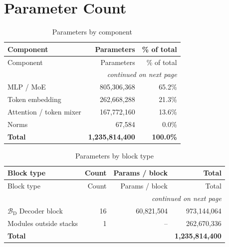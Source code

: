\documentclass[10pt,a4paper]{article}
\begin{document}
\section{Parameter Count}
\begin{longtable}{lrr}
\caption{Parameters by component}\\
\toprule
Component & Parameters & \% of total \\
\midrule
\endfirsthead
\toprule
Component & Parameters & \% of total \\
\midrule
\endhead
\midrule \multicolumn{3}{r}{\textit{continued on next page}} \\
\endfoot
\bottomrule
\endlastfoot
MLP / MoE & 805,306,368 & 65.2\% \\
Token embedding & 262,668,288 & 21.3\% \\
Attention / token mixer & 167,772,160 & 13.6\% \\
Norms & 67,584 & 0.0\% \\
\midrule \textbf{Total} & \textbf{1,235,814,400} & \textbf{100.0\%} \\
\end{longtable}
\begin{longtable}{p{8cm}rrr}
\caption{Parameters by block type}\\
\toprule
Block type & Count & Params / block & Total \\
\midrule
\endfirsthead
\toprule
Block type & Count & Params / block & Total \\
\midrule
\endhead
\midrule \multicolumn{4}{r}{\textit{continued on next page}} \\
\endfoot
\bottomrule
\endlastfoot
$\mathcal{B}_{\mathrm{D}}$ Decoder block & 16 & 60,821,504 & 973,144,064 \\
Modules outside stacks & 1 & -- & 262,670,336 \\
\midrule \textbf{Total} & & & \textbf{1,235,814,400} \\
\end{longtable}
\end{document}
